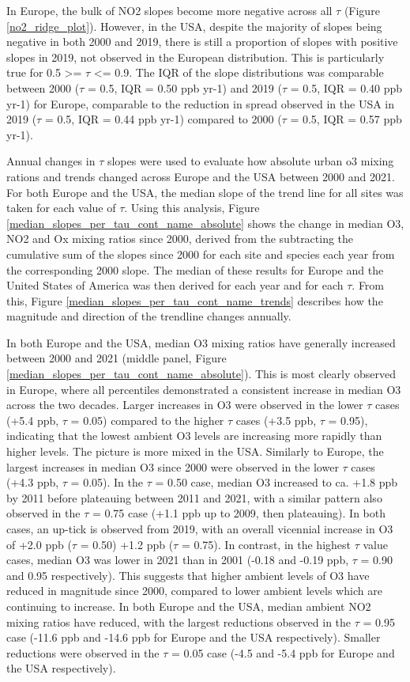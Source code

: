 \documentclass[journal abbreviation, manuscript]{copernicus}
\begin{document}
In Europe, the bulk of NO2 slopes become more negative across all $\tau$ (Figure \ref{no2_ridge_plot}). However, in the USA, despite the majority of slopes being negative in both 2000 and 2019, there is still a proportion of slopes with positive slopes in 2019, not observed in the European distribution. This is particularly true for 0.5 >= $\tau$ <= 0.9. The IQR of the slope distributions was comparable between 2000 ($\tau$ = 0.5, IQR = 0.50 ppb yr-1) and 2019 ($\tau$ = 0.5, IQR = 0.40 ppb yr-1) for Europe, comparable to the reduction in spread observed in the USA in 2019 ($\tau$ = 0.5, IQR = 0.44 ppb yr-1) compared to 2000 ($\tau$ = 0.5, IQR = 0.57 ppb yr-1).


Annual changes in $\tau$ slopes were used to evaluate how absolute urban o3 mixing rations and trends changed across Europe and the USA between 2000 and 2021. For both Europe and the USA, the median slope of the trend line for all sites was taken for each value of $\tau$. Using this analysis, Figure \ref{median_slopes_per_tau_cont_name_absolute} shows the change in median O3, NO2 and Ox mixing ratios since 2000, derived from the subtracting the cumulative sum of the slopes since 2000 for each site and species each year from the corresponding 2000 slope. The median of these results for Europe and the United States of America was then derived for each year and for each $\tau$. From this, Figure \ref{median_slopes_per_tau_cont_name_trends} describes how the magnitude and direction of the trendline changes annually.

In both Europe and the USA, median O3 mixing ratios have generally increased between 2000 and 2021 (middle panel, Figure \ref{median_slopes_per_tau_cont_name_absolute}). This is most clearly observed in Europe, where all percentiles demonstrated a consistent increase in median O3 across the two decades. Larger increases in O3 were observed in the lower $\tau$ cases (+5.4 ppb, $\tau$ = 0.05) compared to the higher $\tau$ cases (+3.5 ppb, $\tau$ = 0.95), indicating that the lowest ambient O3 levels are increasing more rapidly than higher levels. The picture is more mixed in the USA. Similarly to Europe, the largest increases in median O3 since 2000 were observed in the lower $\tau$ cases (+4.3 ppb, $\tau$ = 0.05). In the $\tau$ = 0.50 case, median O3 increased to ca. +1.8 ppb by 2011 before plateauing between 2011 and 2021, with a similar pattern also observed in the $\tau$ = 0.75 case (+1.1 ppb up to 2009, then plateauing). In both cases, an up-tick is observed from 2019, with an overall vicennial increase in O3 of +2.0 ppb ($\tau$ = 0.50) +1.2 ppb ($\tau$ = 0.75). In contrast, in the highest $\tau$ value cases, median O3 was lower in 2021 than in 2001 (-0.18 and -0.19 ppb, $\tau$ = 0.90 and 0.95 respectively). This suggests that higher ambient levels of O3 have reduced in magnitude since 2000, compared to lower ambient levels which are continuing to increase. In both Europe and the USA, median ambient NO2 mixing ratios have reduced, with the largest reductions observed in the $\tau$ = 0.95 case (-11.6 ppb and -14.6 ppb for Europe and the USA respectively). Smaller reductions were observed in the $\tau$ = 0.05 case (-4.5 and -5.4 ppb for Europe and the USA respectively).
\end{document}
